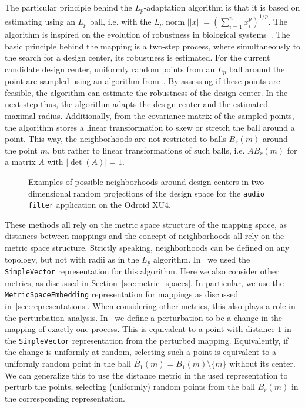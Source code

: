 The particular principle behind the $L_p$-adaptation algorithm is that it is based on estimating using an $L_p$ ball, i.e. with the $L_p$ norm $||x|| = (\sum_{i=1}^n x_i^p)^{1/p}$.
The algorithm is inspired on the evolution of robustness in biological systems~\cite{asmus2017lp}.
The basic principle behind the mapping is a two-step process, where simultaneously to the search for a design center, its robustness is estimated.
For the current candidate design center, uniformly random points from an $L_p$ ball around the point are sampled using an algorithm from~\cite{calafiore1998uniform}.
By assessing if these points are feasible, the algorithm can estimate the robustness of the design center.
In the next step thus, the algorithm adapts the design center and the estimated maximal radius.
Additionally, from the covariance matrix of the sampled points, the algorithm stores a linear transformation to skew or stretch the ball around a point.
This way, the neighborhoods are not restricted to balls $B_r(m)$ around the point $m$, but rather to linear transformations of such balls, i.e. $A B_r(m)$ for a matrix $A$ with $|\operatorname{det}(A)| = 1$.

\begin{figure}[h]
	\centering
	\caption{Examples of possible neighborhoods around design centers in two-dimensional random projections of the design space for the \texttt{audio filter} application on the Odroid XU4.}
	\label{fig:design_centering_exynos}
\end{figure}

These methods all rely on the metric space structure of the mapping space, as distances between mappings and the concept of neighborhoods all rely on the metric space structure.
Strictly speaking, neighborhoods can be defined on any topology, but not with radii as in the $L_p$ algorithm.
In~\cite{hempel_scopes17} we used the \texttt{SimpleVector} representation for this algorithm.
Here we also consider other metrics, as discussed in Section~\ref{sec:metric_spaces}.
In particular, we use the \texttt{MetricSpaceEmbedding} representation for mappings as discussed in~\ref{sec:representations}.
When considering other metrics, this also plays a role in the perturbation analysis.
In~\cite{hempel_scopes17} we define a perturbation to be a change in the mapping of exactly one process.
This is equivalent to a point with distance $1$ in the \texttt{SimpleVector} representation from the perturbed mapping.
Equivalently, if the change is uniformly at random, selecting such a point is equivalent to a uniformly random point in the ball $\overset{\circ}{B}_1(m) = B_1(m) \setminus \{ m \}$ without its center.
We can generalize this to use the distance metric in the used representation to perturb the points, selecting (uniformly) random points from the ball $B_r(m)$ in the corresponding representation.

